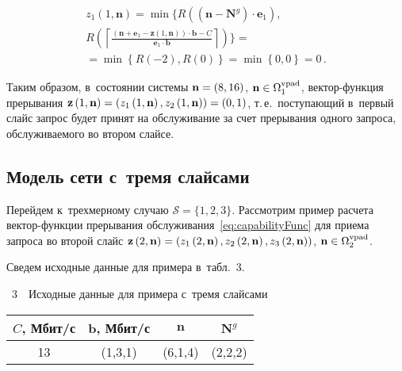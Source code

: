 \begin{multicols}{2}
\noindent
\begin{multline*}
z_1\left(1,\mathbf{n}\right) =
\min
\biggl\{
R \left(\left(\mathbf{n}-\mathbf{N}^{{g}}\right) \cdot \mathbf{e}_1\right), 
\\
R \left(\left\lceil \frac{\left(\mathbf{n}+\mathbf{e}_1 - 
\mathbf{z}\left(1,\mathbf{n}\right) \right)\cdot\mathbf{b} - 
C}{\mathbf{e}_1\cdot\mathbf{b}} \right\rceil\right)
\biggl\} = {}\\
{}= \min \left\{R \left(-2\right),R \left(0\right) \right\} = \min 
\left\{0,0\right\} = 0\,.
\end{multline*}

\vspace*{-4pt}

Таким образом, в~состоянии системы $\mathbf{n}\hm=\left(8,16\right)$, 
$\mathbf{n}\hm\in\Omega_1^{\mathrm{vpad}}$, век\-тор-функ\-ция прерывания 
$\mathbf{z}\left(1,\mathbf{n}\right)\hm=\left(z_1\left(1,\mathbf{n}\right),z_2\left
(1,\mathbf{n}\right)\right)\hm=\left(0,1\right)$,
т.\,е.\ поступающий в~первый слайс запрос будет принят на обслуживание за счет 
прерывания одного запроса, об\-слу\-жи\-ва\-емо\-го во втором слайсе.


\subsection{Модель сети с~тремя слайсами}

Перейдем к~трехмерному случаю $\mathcal{S}=\{1,2,3\}$. Рассмотрим пример расчета 
век\-тор-функ\-ции прерывания обслуживания~\eqref{eq:capabilityFunc} для приема 
запроса во второй слайс 
$\mathbf{z}\left(2,\mathbf{n}\right)\hm=\left(z_1\left(2,\mathbf{n}\right), 
z_2\left(2,\mathbf{n}\right), z_3\left(2,\mathbf{n}\right)\right)$, 
$\mathbf{n}\hm\in\Omega_2^{\mathrm{vpad}}$.

Сведем исходные данные для примера в~табл.~3.

\pagebreak

\noindent
{{\tablename~3}\ \ \small{Исходные данные для примера с~тремя слайсами
}}

\vspace*{3pt}

\begin{center}
{\small 
\tabcolsep=11pt
\begin{tabular}{|c|c|c|c|}
\hline
$C$, Мбит/с & $\mathbf{b}$, Мбит/с& $\mathbf{n}$ & $\mathbf{N}^g$\\
\hline
13& (1,3,1) & (6,1,4)& (2,2,2)\\
\hline
\end{tabular}
}
\end{center}


\end{multicols}
